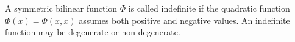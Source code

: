 A symmetric bilinear function $\Phi$ is called indefinite if the quadratic function $\Phi(x) = \Phi(x, x)$ assumes both positive and negative values. An indefinite function may be degenerate or non-degenerate.
